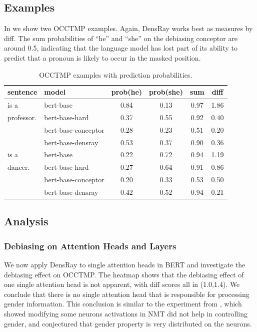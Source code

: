 \subsection{Examples}
In  we show two OCCTMP examples.
Again, DensRay works best as measures by diff.
The sum probabilities of ``he'' and ``she''
on the debiasing conceptor are around 0.5, indicating that
the language model has lost part of its ability to predict that 
a pronoun is  likely to occur in the masked position.
\begin{table}[h]
	\centering
	\footnotesize
		\vspace{0cm}  
	\setlength{\abovecaptionskip}{0.2cm}   
	\setlength{\belowcaptionskip}{0cm}  
	\begin{tabular}{llcccc}
		\hline
		sentence & model & prob(he) & prob(she) &sum&diff\\
		\hline
		[MASK] is a & bert-base & 0.84 & 0.13&0.97&1.86\\
		professor.& bert-base-hard& 0.37 & 0.55&0.92&0.40\\
		& bert-base-conceptor& 0.28 & 0.23&0.51&{0.20}\\
		& bert-base-densray & 0.53 & 0.37&0.90&0.36\\
		\hline
		[MASK] is a & bert-base & 0.22 & 0.72&0.94&1.19\\
		dancer.  & bert-base-hard& 0.27 & 0.64&0.91&0.86\\
		& bert-base-conceptor& 0.20 & 0.33&0.53&0.50\\
		& bert-base-densray& 0.42 & 0.52&0.94&0.21\\
		\hline
	\end{tabular}
	\caption{
		OCCTMP examples with prediction probabilities.}
\end{table}

\subsection{Analysis}

\subsubsection*{Debiasing on Attention Heads and Layers}
We now apply DensRay to single attention heads in BERT and investigate the debiasing effect on OCCTMP. The heatmap  shows that the debiasing effect of one single attention head is not apparent, with diff scores all in (1.0,1.4). We conclude that there is no single attention head that is responsible for processing gender information.
This conclusion is similar to the experiment from , which showed modifying some neurons activations in NMT did not help in controlling gender, and conjectured that gender property is very distributed on the neurons.

